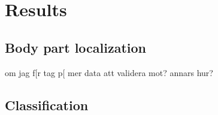 \chapter{Results} \label{ch:results}
\section{Body part localization}
om jag f[r tag p[ mer data att validera mot? annars hur?

\section{Classification}
\subsection{}
